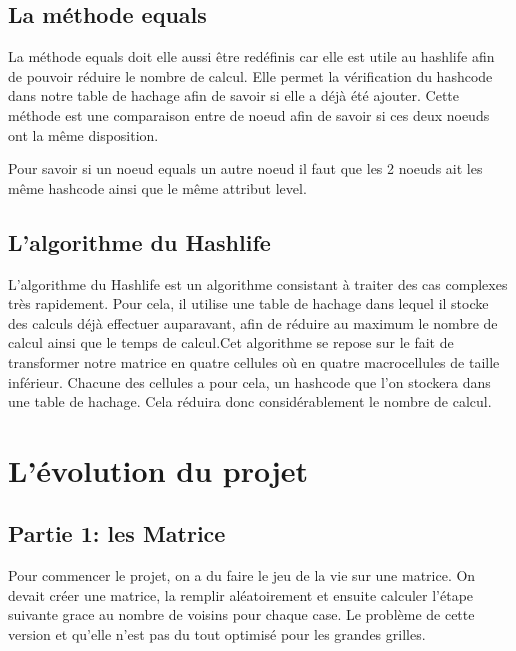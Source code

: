 \documentclass{article}
\begin{document}
\subsection{La méthode equals}
La méthode equals doit elle aussi être redéfinis car elle est utile au hashlife afin de pouvoir réduire le nombre de calcul. Elle permet la vérification du hashcode dans notre table de hachage afin de savoir si elle a déjà été ajouter. Cette méthode est une comparaison entre de noeud afin de savoir si ces deux noeuds ont la même disposition.

\begin{algorithm}
    \DontPrintSemicolon
\caption {Algorithme de la méthode equals de nos noeud.}     
\end{algorithm}

Pour savoir si un noeud equals un autre noeud il faut que les 2 noeuds ait les même hashcode ainsi que le même attribut level.



\subsection{L'algorithme du Hashlife}
L'algorithme du Hashlife est un algorithme consistant à traiter des cas complexes très rapidement. Pour cela, il utilise une table de hachage dans lequel il stocke des calculs déjà effectuer auparavant, afin de réduire au maximum le nombre de calcul ainsi que le temps de calcul.Cet algorithme se repose sur le fait de transformer notre matrice en quatre cellules où en quatre macrocellules de taille inférieur. Chacune des cellules a pour cela, un hashcode que l'on stockera dans une table de hachage. Cela réduira donc considérablement le nombre de calcul. 



\section{L'évolution du projet}
\subsection{Partie 1: les Matrice}
Pour commencer le projet, on a du faire le jeu de la vie sur une matrice.
On devait créer une matrice, la remplir aléatoirement et ensuite  calculer l'étape suivante grace au nombre de voisins pour chaque case. Le problème de cette version et qu'elle n'est pas du tout optimisé pour les grandes grilles.
\end{document}
